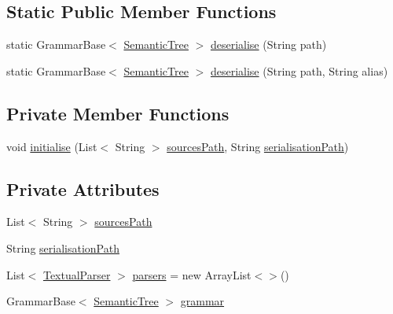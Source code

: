 \subsection*{Static Public Member Functions}
\begin{DoxyCompactItemize}
\item 
static Grammar\-Base$<$ \hyperlink{classit_1_1emarolab_1_1cagg_1_1core_1_1evaluation_1_1semanticGrammar_1_1SemanticTree}{Semantic\-Tree} $>$ \hyperlink{classit_1_1emarolab_1_1cagg_1_1interfaces_1_1CaggCompiler_a6a531e89151226e75f3ef61c71e40819}{deserialise} (String path)
\item 
static Grammar\-Base$<$ \hyperlink{classit_1_1emarolab_1_1cagg_1_1core_1_1evaluation_1_1semanticGrammar_1_1SemanticTree}{Semantic\-Tree} $>$ \hyperlink{classit_1_1emarolab_1_1cagg_1_1interfaces_1_1CaggCompiler_a30d969e1571ce95a3f24d91e5138f4fb}{deserialise} (String path, String alias)
\end{DoxyCompactItemize}
\subsection*{Private Member Functions}
\begin{DoxyCompactItemize}
\item 
void \hyperlink{classit_1_1emarolab_1_1cagg_1_1interfaces_1_1CaggCompiler_aa08fea21abfab0c67c0974b8be398e8b}{initialise} (List$<$ String $>$ \hyperlink{classit_1_1emarolab_1_1cagg_1_1interfaces_1_1CaggCompiler_aaf15dc18fa5f445c633ccd5918e236ed}{sources\-Path}, String \hyperlink{classit_1_1emarolab_1_1cagg_1_1interfaces_1_1CaggCompiler_adff370ab0237bd5b87746bb838cee15f}{serialisation\-Path})
\end{DoxyCompactItemize}
\subsection*{Private Attributes}
\begin{DoxyCompactItemize}
\item 
List$<$ String $>$ \hyperlink{classit_1_1emarolab_1_1cagg_1_1interfaces_1_1CaggCompiler_aaf15dc18fa5f445c633ccd5918e236ed}{sources\-Path}
\item 
String \hyperlink{classit_1_1emarolab_1_1cagg_1_1interfaces_1_1CaggCompiler_adff370ab0237bd5b87746bb838cee15f}{serialisation\-Path}
\item 
List$<$ \hyperlink{classit_1_1emarolab_1_1cagg_1_1core_1_1language_1_1parser_1_1TextualParser}{Textual\-Parser} $>$ \hyperlink{classit_1_1emarolab_1_1cagg_1_1interfaces_1_1CaggCompiler_a12b06f200f3c0dd8c0a319a7b7115db9}{parsers} = new Array\-List$<$$>$()
\item 
Grammar\-Base$<$ \hyperlink{classit_1_1emarolab_1_1cagg_1_1core_1_1evaluation_1_1semanticGrammar_1_1SemanticTree}{Semantic\-Tree} $>$ \hyperlink{classit_1_1emarolab_1_1cagg_1_1interfaces_1_1CaggCompiler_a30ec71709780b31cdbb3000df5858c21}{grammar}
\end{DoxyCompactItemize}
